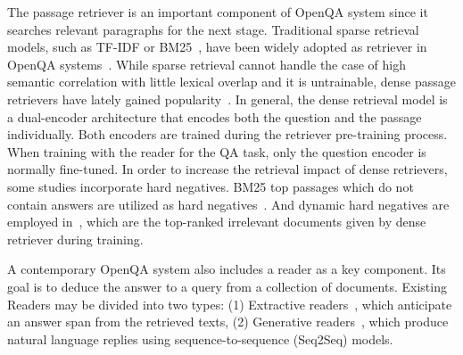 The passage retriever is an important component of OpenQA system since it searches relevant paragraphs for the next stage. 
Traditional sparse retrieval models, such as TF-IDF or BM25~\cite{robertson2009probabilistic}, have been widely adopted as retriever in OpenQA systems~\cite{chen2017reading, yang2019end, lin2018denoising}. While sparse retrieval cannot handle the case of high semantic correlation with little lexical overlap and it is untrainable, dense passage retrievers have lately gained popularity~\cite{lee2019latent, guu2020realm, karpukhin2020dense, Qu2021RocketQAAO}. 
In general, the dense retrieval model is a dual-encoder architecture that encodes both the question and the passage individually. Both encoders are trained during the retriever pre-training process. When training with the reader for the QA task, only the question encoder is normally fine-tuned.
In order to increase the retrieval impact of dense retrievers, some studies incorporate hard negatives. 
BM25 top passages which do not contain answers are utilized as hard negatives~\cite{karpukhin2020dense, gao2020complementing}. And dynamic hard negatives are employed in~\cite{xiong2021approximate, zhan2021optimizing,guu2020realm}, which are the top-ranked irrelevant documents given by dense retriever during training. 

A contemporary OpenQA system also includes a reader as a key component. Its goal is to deduce the answer to a query from a collection of documents. Existing Readers may be divided into two types: (1) Extractive readers~\cite{chen2017reading,yang2019end,karpukhin2020dense}, which anticipate an answer span from the retrieved texts, (2) Generative readers~\cite{lewis2020retrieval,izacard2021leveraging}, which produce natural language replies using sequence-to-sequence (Seq2Seq) models.

